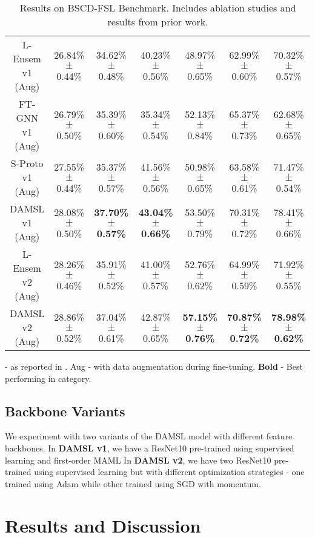\documentclass[final]{cvpr}
\begin{document}
\begin{table*}[t]
{{\begin{tabular}{ccccccc}
\\
L-Ensem v1 (Aug) & 26.84\% \(\pm\) 0.44\% & 34.62\% \(\pm\) 0.48\% & 40.23\% \(\pm\) 0.56\% & 48.97\%  \(\pm\) 0.65\% & 62.99\% \(\pm\) 0.60\% & 70.32\% \(\pm\) 0.57\% \\
FT-GNN v1 (Aug) & 26.79\% \(\pm\) 0.50\% & 35.39\% \(\pm\) 0.60\% & 35.34\% \(\pm\) 0.54\% & 52.13\% \(\pm\) 0.84\% & 65.37\% \(\pm\) 0.73\% & 62.68\% \(\pm\) 0.65\%  \\
S-Proto v1 (Aug) & 27.55\% \(\pm\) 0.44\% & 35.37\% \(\pm\) 0.57\% & 41.56\% \(\pm\) 0.56\% & 50.98\% \(\pm\) 0.65\% & 63.58\% \(\pm\) 0.61\% & 71.47\% \(\pm\) 0.54\%  \\
DAMSL v1 (Aug) & 28.08\% \(\pm\) 0.50\% & \textbf{37.70\% \(\pm\) 0.57\%} & \textbf{43.04\% \(\pm\) 0.66\%} & 53.50\% \(\pm\) 0.79\% & 70.31\% \(\pm\) 0.72\% & 78.41\% \(\pm\) 0.66\%  \\
L-Ensem v2 (Aug) & 28.26\% \(\pm\) 0.46\% & 35.91\% \(\pm\) 0.52\% & 41.00\% \(\pm\) 0.57\% & 52.76\%  \(\pm\) 0.62\% & 64.99\% \(\pm\) 0.59\% & 71.92\% \(\pm\) 0.55\% \\
DAMSL v2 (Aug) & 28.86\% \(\pm\) 0.52\% & 37.04\% \(\pm\) 0.61\% & 42.87\% \(\pm\) 0.65\% & \textbf{57.15\% \(\pm\) 0.76\%} & \textbf{70.87\% \(\pm\) 0.72\%} & \textbf{78.98\% \(\pm\) 0.62\%}  \\
\bottomrule
\end{tabular}}}
\begin{footnotesize}
\Cross  -  as reported in \cite{guo2020broader}. Aug - with data augmentation during fine-tuning. \textbf{Bold} - Best performing in category. 
\end{footnotesize} 
\vskip 1mm
\caption{Results on BSCD-FSL Benchmark. Includes ablation studies and results from prior work. }
\label{tab:singlesource}\end{table*}


\subsection{Backbone Variants}
We experiment with two variants of the DAMSL model with different feature backbones. In \textbf{DAMSL v1}, we have a ResNet10 pre-trained using supervised learning and first-order MAML \cite{nichol2018first} In \textbf{DAMSL v2}, we have two ResNet10 pre-trained using supervised learning but with different optimization strategies - one trained using Adam while other trained using SGD with momentum. 

\section{Results and Discussion}
\end{document}
